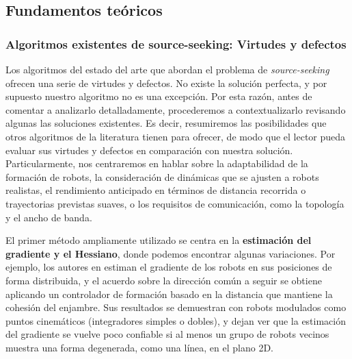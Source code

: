 

\subsection{Fundamentos teóricos}

\subsubsection{Algoritmos existentes de source-seeking: Virtudes y defectos}

Los algoritmos del estado del arte que abordan el problema de \textit{source-seeking} ofrecen una serie de virtudes y defectos. No existe la solución perfecta, y por supuesto nuestro algoritmo no es una excepción. Por esta razón, antes de comentar a analizarlo detalladamente, procederemos a contextualizarlo revisando algunas las soluciones existentes. Es decir, resumiremos las posibilidades que otros algoritmos de la literatura tienen para ofrecer, de modo que el lector pueda evaluar sus virtudes y defectos en comparación con nuestra solución. Particularmente, nos centraremos en hablar sobre la adaptabilidad de la formación de robots, la consideración de dinámicas que se ajusten a robots realistas, el rendimiento anticipado en términos de distancia recorrida o trayectorias previstas suaves, o los requisitos de comunicación, como la topología y el ancho de banda.

El primer método ampliamente utilizado se centra en la \textbf{estimación del gradiente y el Hessiano}, donde podemos encontrar algunas variaciones. Por ejemplo, los autores en \cite{rosero2014cooperative, barogh2017cooperative} estiman el gradiente de los robots en sus posiciones de forma distribuida, y el acuerdo sobre la dirección común a seguir se obtiene aplicando un controlador de formación basado en la distancia que mantiene la cohesión del enjambre. Sus resultados se demuestran con robots modulados como puntos cinemáticos (integradores simples o dobles), y dejan ver que la estimación del gradiente se vuelve poco confiable si al menos un grupo de robots vecinos muestra una forma degenerada, como una línea, en el plano 2D. 

